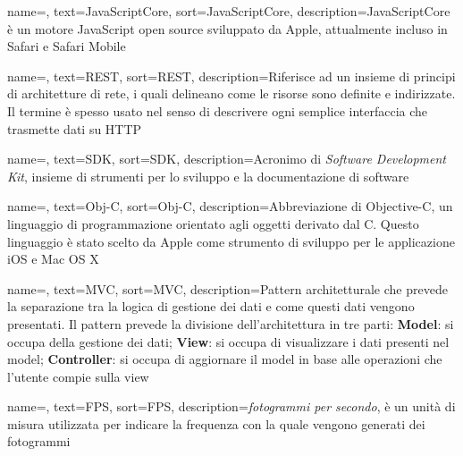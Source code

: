 {
    name=,
    text=JavaScriptCore,
    sort=JavaScriptCore,
    description={JavaScriptCore è un motore JavaScript open source sviluppato da Apple, attualmente incluso in Safari e Safari Mobile}
}

{
    name=,
    text=REST,
    sort=REST,
    description={Riferisce ad un insieme di principi di architetture di rete, i quali delineano come le risorse sono definite e indirizzate. Il termine è spesso usato nel senso di descrivere ogni semplice interfaccia che trasmette dati su HTTP}
}

{
name=,
text=SDK,
sort=SDK,
description={Acronimo di \textit{Software Development Kit}, insieme di strumenti per lo sviluppo e la documentazione di software}
}

{
    name=,
    text=Obj-C,
    sort=Obj-C,
    description={Abbreviazione di Objective-C, un linguaggio di programmazione orientato agli oggetti derivato dal C. Questo linguaggio è stato scelto da Apple come strumento di sviluppo per le applicazione iOS e Mac OS X}
}

{
    name=,
    text=MVC,
    sort=MVC,
    description={Pattern architetturale che prevede la separazione tra la logica di gestione dei dati e come questi dati vengono presentati. Il pattern prevede la divisione dell'architettura in tre parti: \textbf{Model}: si occupa della gestione dei dati; \textbf{View}: si occupa di visualizzare i dati presenti nel model; \textbf{Controller}: si occupa di aggiornare il model in base alle operazioni che l'utente compie sulla view}
}

{
name=,
text=FPS,
sort=FPS,
description={\textit{fotogrammi per secondo}, è un unità di misura utilizzata per indicare la frequenza con la quale vengono generati dei fotogrammi}
}
